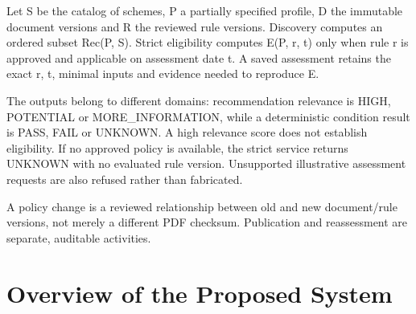\documentclass[12pt,a4paper,twoside]{report}
\begin{document}
Let S be the catalog of schemes, P a partially specified profile, D the immutable document versions and R the reviewed rule versions. Discovery computes an ordered subset Rec(P, S). Strict eligibility computes E(P, r, t) only when rule r is approved and applicable on assessment date t. A saved assessment retains the exact r, t, minimal inputs and evidence needed to reproduce E.

The outputs belong to different domains: recommendation relevance is HIGH, POTENTIAL or MORE\_INFORMATION, while a deterministic condition result is PASS, FAIL or UNKNOWN. A high relevance score does not establish eligibility. If no approved policy is available, the strict service returns UNKNOWN with no evaluated rule version. Unsupported illustrative assessment requests are also refused rather than fabricated.

A policy change is a reviewed relationship between old and new document/rule versions, not merely a different PDF checksum. Publication and reassessment are separate, auditable activities.

\section{Overview of the Proposed System}
\end{document}
